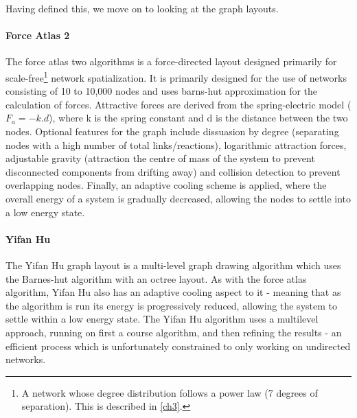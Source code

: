 Having defined this, we move on to looking at the graph layouts.

\paragraph{Force Atlas 2}
The force atlas two \citep{fa} algorithms is a force-directed layout designed primarily for scale-free\footnote{A network whose degree distribution follows a power law (7 degrees of separation). This is described in \autoref{ch3}.} network spatialization. It is primarily designed for the use of networks consisting of 10 to 10,000 nodes and uses barns-hut approximation for the calculation of forces. Attractive forces are derived from the spring-electric model ($F_a = -k.d$), where k is the spring constant and d is the distance between the two nodes. Optional features for the graph include dissuasion by degree (separating nodes with a high number of total links/reactions), logarithmic attraction forces, adjustable gravity (attraction the centre of mass of the system to prevent disconnected components from drifting away) and collision detection to prevent overlapping nodes. Finally, an adaptive cooling scheme is applied, where the overall energy of a system is gradually decreased, allowing the nodes to settle into a low energy state.

\paragraph{Yifan Hu}
The Yifan Hu graph layout \citep{yh} is a multi-level graph drawing algorithm which uses the Barnes-hut algorithm with an octree layout. As with the force atlas algorithm, Yifan Hu also has an adaptive cooling aspect to it - meaning that as the algorithm is run its energy is progressively reduced, allowing the system to settle within a low energy state. The Yifan Hu algorithm uses a multilevel approach, running on first a course algorithm, and then refining the results - an efficient process which is unfortunately constrained to only working on undirected networks.
%
%

